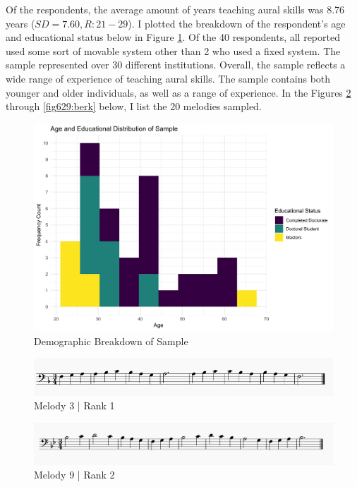 \documentclass[12pt,]{book}
\begin{document}
Of the respondents, the average amount of years teaching aural skills was 8.76 years (\(SD = 7.60, R: 21-29\)).
I plotted the breakdown of the respondent's age and educational status below in Figure \ref{fig:surveyageeducation}.
Of the 40 respondents, all reported used some sort of movable system other than 2 who used a fixed system.
The sample represented over 30 different institutions.
Overall, the sample reflects a wide range of experience of teaching aural skills.
The sample contains both younger and older individuals, as well as a range of experience.
In the Figures \ref{fig:berk3} through \ref{fig629:berk} below, I list the 20 melodies sampled.

\begin{figure}

{\centering \includegraphics[width=0.8\linewidth]{img/ageedsurveydistribution} 

}

\caption{Demographic Breakdown of Sample}\label{fig:surveyageeducation}
\end{figure}

\begin{figure}

{\centering \includegraphics[width=1\linewidth]{img/survey_melodies/Berkowitz3} 

}

\caption{Melody 3   | Rank 1}\label{fig:berk3}
\end{figure}

\begin{figure}

{\centering \includegraphics[width=1\linewidth]{img/survey_melodies/Berkowitz9} 

}

\caption{Melody  9  | Rank 2}\label{fig:berk9}
\end{figure}
\end{document}
